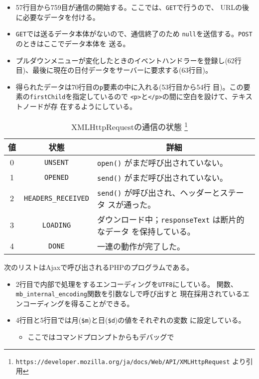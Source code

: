 \begin{Exec}
\begin{itemize}
 \item 57行目から759目が通信の開始する。ここでは、\texttt{GET}で行うので、
       URLの後に必要なデータを付ける。
 \item \texttt{GET}では送るデータ本体がないので、通信終了のため
       \texttt{null}を送信する。\texttt{POST}のときはここでデータ本体を
       送る。
 \item プルダウンメニューが変化したときのイベントハンドラーを登録し(62行
       目)、最後に現在の日付データをサーバーに要求する(63行目)。
 \item 得られたデータは70行目の\texttt{p}要素の中に入れる(53行目から54行
       目)。この要素の\texttt{firstChild}を指定しているので
       \texttt{<p>}と\texttt{</p>}の間に空白を設けて、テキストノードが存
       在するようにしている。
\end{itemize}
 \begin{table}[ht]
	\caption{XMLHttpRequestの通信の状態
\protect\footnote{\protect\texttt{https://developer.mozilla.org/ja/docs/Web/API/XMLHttpRequest}
	より引用}} \label{XMLHttpRequestRes}
		\begin{tabular}{|c|c|m{}|}\hline
		 値&状態&\multicolumn{1}{c|}{詳細}\\\hline
		 0&\Verb+UNSENT+&\Verb+open()+ がまだ呼び出されていない。\\\hline
1&\Verb+OPENED+&\Verb+send()+ がまだ呼び出されていない。\\\hline
2&\Verb+HEADERS_RECEIVED+&\Verb+send()+ が呼び出され、ヘッダーとステータ
						 スが通った。\\\hline 
3&\Verb+LOADING+&ダウンロード中；\Verb+responseText+ は断片的なデータ
						 を保持している。\\\hline 
4&\Verb+DONE+&一連の動作が完了した。\\\hline
		\end{tabular}
 \end{table}

 次のリストはAjaxで呼び出されるPHPのプログラムである。
\begin{itemize}
 \item 2行目で内部で処理をするエンコーディングを\texttt{UTF8}にしている。
       関数、\texttt{mb\_internal\_encoding}関数を引数なしで呼び出すと
       現在採用されているエンコーディングを得ることができる。
 \item 4行目と5行目では月(\Verb+$m+)と日(\Verb+$d+)の値をそれぞれの変数
       に設定している。
\begin{itemize}
 \item ここではコマンドプロンプトからもデバッグで

\end{itemize}
\end{itemize}
\end{Exec}

